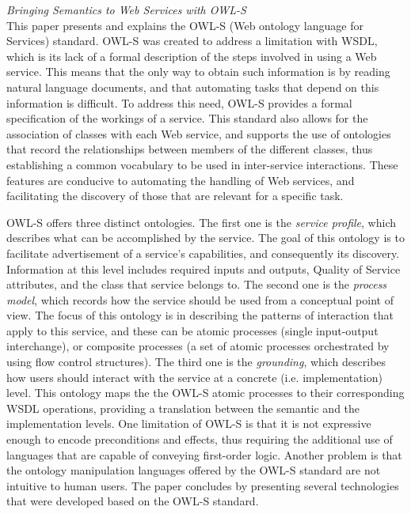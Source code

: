 \textit{Bringing Semantics to Web Services with OWL-S \cite{martin2007bringing}}\\
This paper presents and explains the OWL-S (Web ontology language for Services) standard. OWL-S
was created to address a limitation with WSDL, which is its lack of a formal description of the
steps involved in using a Web service. This means that the only way to obtain such information
is by reading natural language documents, and that automating tasks that depend on this information
is difficult. To address this need, OWL-S provides a formal specification of the workings of a service.
This standard also allows for the association of classes with each Web service, and supports the use
of ontologies that record the relationships between members of the different classes, thus establishing
a common vocabulary to be used in inter-service interactions. These features are conducive to automating
the handling of Web services, and facilitating the discovery of those that are relevant for a specific
task.

OWL-S offers three distinct ontologies. The first one is the \textit{service profile}, which describes what
can be accomplished by the service. The goal of this ontology is to facilitate advertisement of a service's
capabilities, and consequently its discovery. Information at this level includes required inputs and outputs,
Quality of Service attributes, and the class that service belongs to. The second one is the
\textit{process model}, which records how the service should be used from a conceptual point of view.
The focus of this ontology is in describing the patterns of interaction that apply to this service, and these
can be atomic processes (single input-output interchange), or composite processes (a set of atomic processes
orchestrated by using flow control structures). The third one is the \textit{grounding}, which describes how
users should interact with the service at a concrete (i.e. implementation) level. This ontology maps the
the OWL-S atomic processes to their corresponding WSDL operations, providing a translation between the
semantic and the implementation levels. One limitation of OWL-S is that it is not expressive enough to encode
preconditions and effects, thus requiring the additional use of languages that are capable of conveying
first-order logic. Another problem is that the ontology manipulation languages offered by the OWL-S standard
are not intuitive to human users. The paper concludes by presenting several technologies that were developed
based on the OWL-S standard.


